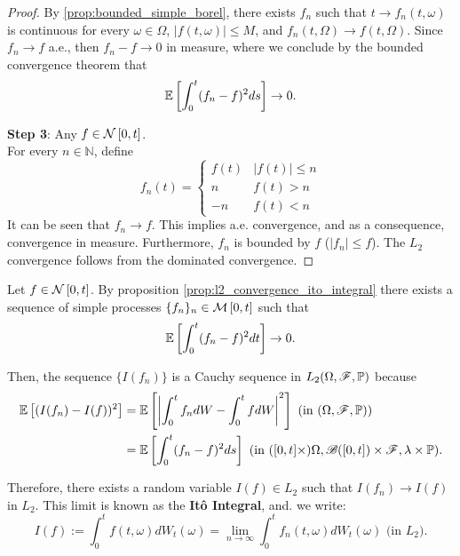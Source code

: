 \documentclass[../TGMAFFIRO.tex]{subfiles}
\begin{document}
\begin{proposition}
\begin{proof}
By \ref{prop:bounded_simple_borel}, there exists $f_n$ such that $t\to f_n(t,\omega)$ is continuous for every $\omega\in\Omega$, $|f(t,\omega)|\leq M$, and $f_n(t,\Omega) \to f(t,\Omega)$. Since $f_n\to f$ a.e., then $f_n - f \to 0$ in measure, where we conclude by the bounded convergence theorem that
	\begin{equation}
		\mathbb{E}\left[\int_0^t(f_n - f)^2 ds\right] \to 0.
	\end{equation}

\textbf{Step 3}: Any $f\in\mathcal{N}\left[0, t\right]$.\\
For every $n\in\mathbb{N}$, define
	\begin{equation}
		f_n(t) = \begin{cases}
					f(t) & |f(t)|\leq n\\
					n 	 & f(t) > n \\
					-n   & f(t) < n
			     \end{cases}
	\end{equation}
It can be seen that $f_n\to f$. This implies a.e. convergence, and as a consequence, convergence in measure. Furthermore, $f_n$ is bounded by $f$ ($|f_n| \leq f$). The $L_2$ convergence follows from the dominated convergence.
\end{proof}
\end{proposition}

\begin{definition}
	Let $f\in\mathcal{N}\left[0, t\right]$. By proposition \ref{prop:l2_convergence_ito_integral} there exists a sequence of simple processes $\{f_n\}_{n} \in \mathcal{M}\left[0, t\right]$ such that
	\begin{equation}
		\mathbb{E}\left[\int_0^t (f_n - f)^2 dt\right] \to 0.
	\end{equation}
	
	Then, the sequence $\{I(f_n)\}$ is a Cauchy sequence in $L_2(\Omega, \mathscr{F}, \mathbb{P})$ because
	\begin{align*}
		\mathbb{E}\left[(I(f_n) - I(f))^2\right] &= \mathbb{E}\left[\left|\int_0^t f_n dW - \int_0^t f dW\right|^2\right] \text{ (in $(\Omega, \mathscr{F}, \mathbb{P})$)} \\
								&= \mathbb{E}\left[\int_0^t(f_n - f)^2 ds\right] \text{ (in $([0,t]\times)\Omega,\mathscr B{([0,t])}\times\mathscr{F}, \lambda\times\mathbb{P} $)}.
	\end{align*}
	
	Therefore, there exists a random variable $I(f)\in L_2$ such that $I(f_n) \to I(f)$ in $L_2$. This limit is known as the \textbf{It\^o Integral}, and. we write:
	\begin{equation}
		I(f) := \int_0^t f(t, \omega) dW_t(\omega) = \lim_{n\to\infty}\int_0^t f_n(t,\omega) dW_t(\omega) \text{ (in $L_2$)}.
	\end{equation}
\end{definition}
\end{document}
